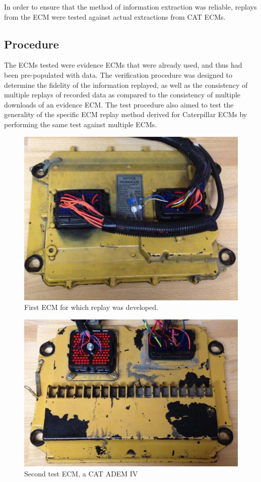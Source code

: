 In order to ensure that the method of information extraction was reliable, replays from the ECM were tested against
actual extractions from CAT ECMs.

\subsection{Procedure}

The ECMs tested were evidence ECMs that were already used, and thus had been pre-populated with data.
The verification procedure was designed to determine the fidelity of the information replayed, as well as the
consistency of multiple replays of recorded data as compared to the consistency of multiple downloads of an
evidence ECM. The test procedure also aimed to test the generality of the specific ECM replay method derived
for Caterpillar ECMs by performing the same test against multiple ECMs.

\begin{figure}[h]
  \centering
  \includegraphics[scale=.2]{cat-ecm-1}
  \caption{First ECM for which replay was developed.}
  \label{fig:cat-ecm-1}
\end{figure}

\begin{figure}[h]
  \centering
  \includegraphics[scale=.2]{cat-ecm-2}
  \caption{Second test ECM, a CAT ADEM IV}
  \label{fig:cat-ecm-2}
\end{figure}


